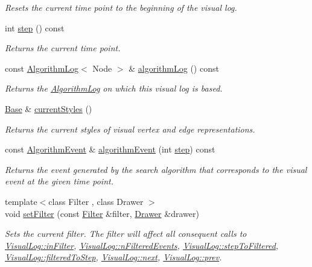 \begin{DoxyCompactItemize}
\begin{DoxyCompactList}\small\item\em Resets the current time point to the beginning of the visual log. \end{DoxyCompactList}\item 
int \hyperlink{structVisualLog_a7fb296e9d2f755787cd1a0e2e16a0e77}{step} () const 
\begin{DoxyCompactList}\small\item\em Returns the current time point. \end{DoxyCompactList}\item 
const \hyperlink{structAlgorithmLog}{Algorithm\+Log}$<$ Node $>$ \& \hyperlink{structVisualLog_a5d0f21515897bca65462d3889c179bde}{algorithm\+Log} () const 
\begin{DoxyCompactList}\small\item\em Returns the \hyperlink{structAlgorithmLog}{Algorithm\+Log} on which this visual log is based. \end{DoxyCompactList}\item 
\hyperlink{structBase}{Base} \& \hyperlink{structVisualLog_ac11311944c46ba4ca1f77458fd8f4ae9}{current\+Styles} ()
\begin{DoxyCompactList}\small\item\em Returns the current styles of visual vertex and edge representations. \end{DoxyCompactList}\item 
const \hyperlink{structVisualLog_a90bc804c23c7d24b7857d8f79c46afbb}{Algorithm\+Event} \& \hyperlink{structVisualLog_a66a8367d305a1b4f6d796af359ed0822}{algorithm\+Event} (int \hyperlink{structVisualLog_a7fb296e9d2f755787cd1a0e2e16a0e77}{step}) const 
\begin{DoxyCompactList}\small\item\em Returns the event generated by the search algorithm that corresponds to the visual event at the given time point. \end{DoxyCompactList}\item 
{\footnotesize template$<$class Filter , class Drawer $>$ }\\void \hyperlink{structVisualLog_a66d1cd69f3a3f320bd1292c1c0404772}{set\+Filter} (const \hyperlink{structFilter}{Filter} \&filter, \hyperlink{structDrawer}{Drawer} \&drawer)
\begin{DoxyCompactList}\small\item\em Sets the current filter. The filter will affect all consequent calls to \hyperlink{structVisualLog_a206f0b3092af7c45dd2a69f98fc36c29}{Visual\+Log\+::in\+Filter}, \hyperlink{structVisualLog_a36105c1fc60348e9bbef1bffa08a3a71}{Visual\+Log\+::n\+Filtered\+Events}, \hyperlink{structVisualLog_af2765ed0921d608071988ac0b0200b54}{Visual\+Log\+::step\+To\+Filtered}, \hyperlink{structVisualLog_a5e64209b901dc682a28a4b5ab8e4b4b8}{Visual\+Log\+::filtered\+To\+Step}, \hyperlink{structVisualLog_abf41d29745df2d99f1bffbe4c13d74fc}{Visual\+Log\+::next}, \hyperlink{structVisualLog_a0aa831e50b827b51cd0a5c9a2ba8cb48}{Visual\+Log\+::prev}. \end{DoxyCompactList}\item 

\end{DoxyCompactItemize}
